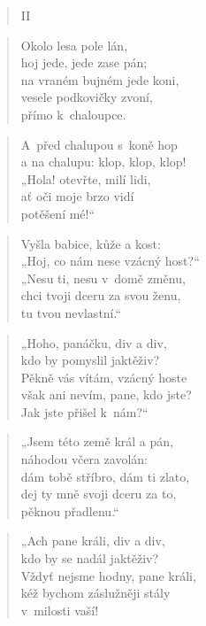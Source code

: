 \begin{verse}
II
\end{verse}

\begin{verse}
Okolo lesa pole lán, \\
hoj jede, jede zase pán; \\
na vraném bujném jede koni, \\
vesele podkovičky zvoní, \\
přímo k~chaloupce.
\end{verse}

\begin{verse}
A~před chalupou s~koně hop \\
a na chalupu: klop, klop, klop! \\
„Hola! otevřte, milí lidi, \\
ať oči moje brzo vidí \\
potěšení mé!“
\end{verse}

\begin{verse}
Vyšla babice, kůže a kost: \\
„Hoj, co nám nese vzácný host?“ \\
„Nesu ti, nesu v~domě změnu, \\
chci tvoji dceru za svou ženu, \\
tu tvou nevlastní.“
\end{verse}

\begin{verse}
„Hoho, panáčku, div a div, \\
kdo by pomyslil jaktěživ? \\
Pěkně vás vítám, vzácný hoste \\
však ani nevím, pane, kdo jste? \\
Jak jste přišel k~nám?“
\end{verse}

\begin{verse}
„Jsem této země král a pán, \\
náhodou včera zavolán: \\
dám tobě stříbro, dám ti zlato, \\
dej ty mně svoji dceru za to, \\
pěknou přadlenu.“
\end{verse}

\begin{verse}
„Ach pane králi, div a div, \\
kdo by se nadál jaktěživ? \\
Vždyť nejsme hodny, pane králi, \\
kéž bychom záslužněji stály \\
v~milosti vaší!
\end{verse}

